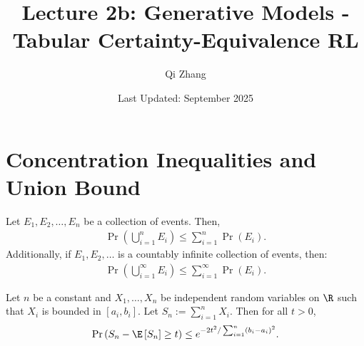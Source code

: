 \title{Lecture 2b: Generative Models - Tabular Certainty-Equivalence RL}
\author{Qi Zhang}
\date{Last Updated: September 2025}

\section{Concentration Inequalities and Union Bound}

\begin{theorem}
\label{theorem:The union bound}
Let $E_1, E_2, \ldots, E_n$ be a collection of events. Then,
\begin{align*}
\Pr\left(\bigcup_{i=1}^n E_i\right) \leq \sum_{i=1}^n \Pr\left(E_i\right)
.
\end{align*}
Additionally, if $E_1, E_2, \ldots$ is a countably infinite collection of events, then:
\begin{align*}
\Pr\left(\bigcup_{i=1}^{\infty} E_i\right) \leq \sum_{i=1}^{\infty} \Pr\left(E_i\right)
.
\end{align*}
\end{theorem}

\begin{theorem}
\label{theorem:Hoeffding's inequality}
Let $n$ be a constant and $X_1, \ldots, X_n$ be independent random variables on $\R$ such that $X_i$ is bounded in $\left[a_i, b_i\right]$. Let $S_n:=\sum_{i=1}^n X_i$. Then for all $t>0$,
\begin{align*}
\Pr\left(S_n-\E\left[S_n\right] \geq t\right) \leq e^{-2 t^2 / \sum_{i=1}^n\left(b_i-a_i\right)^2}.
\end{align*}
\end{theorem}

